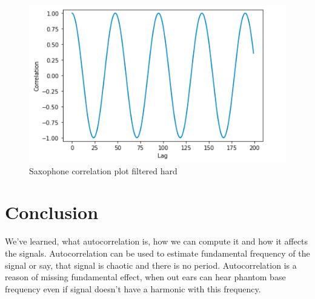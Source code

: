 \documentclass[a4paper]{article}
\begin{document}
            \begin{figure}[H]
                \centering
                \includegraphics[width=\textwidth]{img/sac_corr_3.png}
                \caption{Saxophone correlation plot filtered hard}
                \label{fig:part42}
            \end{figure}
    
    \newpage
        \section{Conclusion}
            We've learned, what autocorrelation is, how we can compute it and how it affects the signals. Autocorrelation can be used to estimate fundamental frequency of the signal or say, that signal is chaotic and there is no period. Autocorrelation is a reason of missing fundamental effect, when out ears can hear phantom base frequency even if signal doesn't have a harmonic with this frequency.
     
\end{document}
